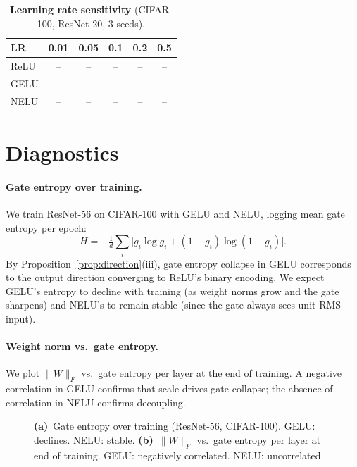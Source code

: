 \begin{table}[h]
\centering
\caption{\textbf{Learning rate sensitivity} (CIFAR-100, ResNet-20, 3 seeds).}
\label{tab:lr}
\vspace{0.5em}
\small
\begin{tabular}{lccccc}
\toprule
LR    & 0.01 & 0.05 & 0.1 & 0.2 & 0.5 \\
\midrule
ReLU  & --   & --   & --  & --  & --  \\
GELU  & --   & --   & --  & --  & --  \\
NELU  & --   & --   & --  & --  & --  \\
\bottomrule
\end{tabular}
\end{table}


\section{Diagnostics}\label{app:diagnostics}

\paragraph{Gate entropy over training.}
We train ResNet-56 on CIFAR-100 with GELU and NELU, logging mean gate entropy per epoch:
\begin{equation}
    H = -\tfrac{1}{d}\textstyle\sum_i\bigl[g_i \log g_i + (1{-}g_i)\log(1{-}g_i)\bigr].
\end{equation}
By Proposition~\ref{prop:direction}(iii), gate entropy collapse in GELU corresponds to the output direction converging to ReLU's binary encoding.
We expect GELU's entropy to decline with training (as weight norms grow and the gate sharpens) and NELU's to remain stable (since the gate always sees unit-RMS input).

\paragraph{Weight norm vs.\ gate entropy.}
We plot $\|W\|_F$ vs.\ gate entropy per layer at the end of training.
A negative correlation in GELU confirms that scale drives gate collapse; the absence of correlation in NELU confirms decoupling.

\begin{figure}[h]
\centering
\caption{\textbf{(a)}~Gate entropy over training (ResNet-56, CIFAR-100). GELU: declines. NELU: stable.
\textbf{(b)}~$\|W\|_F$ vs.\ gate entropy per layer at end of training. GELU: negatively correlated. NELU: uncorrelated.}
\label{fig:diagnostics}
\end{figure}


